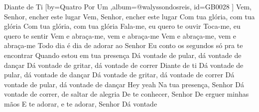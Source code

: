 \beginsong
{Diante de Ti %
}[by={Quatro Por Um %
},album={@walyssondosreis},
id={GB0028 %
}] 
\beginverse*
Vem, Senhor, encher este lugar
Vem, Senhor, encher este lugar
Com tua glória, com tua glória
Com tua glória, com tua glória
\endverse
\beginverse*
Fala-me, eu quero te ouvir
Toca-me, eu quero te sentir
Vem e abraça-me, vem e abraça-me
Vem e abraça-me, vem e abraça-me
\endverse
\beginverse*
Todo dia é dia de adorar ao Senhor
Eu conto os segundos só pra te encontrar
Quando estou em tua presença
\endverse
\beginchorus
Dá vontade de pular, dá vontade de dançar
Dá vontade de gritar, dá vontade de correr
Diante de ti
Dá vontade de pular, dá vontade de dançar
Dá vontade de gritar, dá vontade de correr
Dá vontade de pular, dá vontade de dançar
Hey yeah
\endchorus
\beginverse*
Na tua presença, Senhor
Dá vontade de correr, de saltar de alegria
De te conhecer, Senhor
De erguer minhas mãos
E te adorar, e te adorar, Senhor
Dá vontade
\endverse
\begin{comment}
\lstset{basicstyle=\scriptsize\bf} %
\tab{Solo 1}
\begin{lstlisting}
E|-----------------------------------------------------|
B|-----------------------------------------------------|
G|-----------------------------------------------------|
D|-----------------------------------------------------|
A|-----------------------------------------------------|
E|-----------------------------------------------------|
\end{lstlisting}
\end{comment}
\vspace{2em} 
